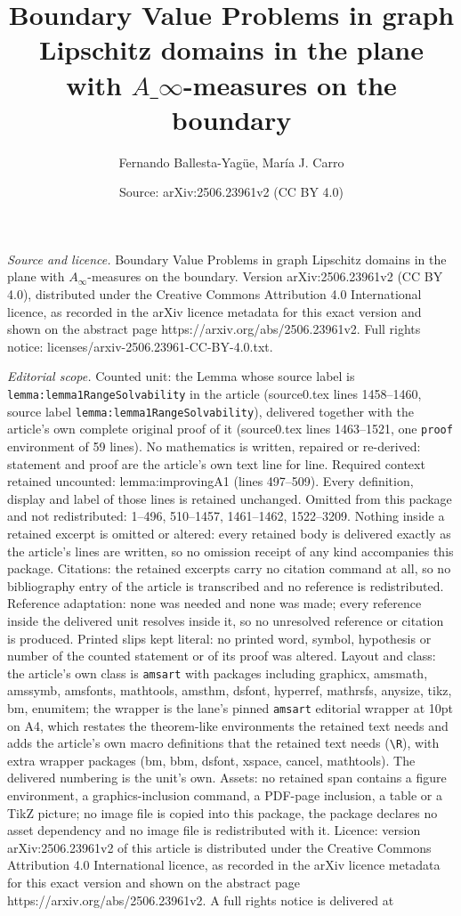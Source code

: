 \documentclass[10pt,a4paper]{amsart}
\title[Boundary Value Problems in graph Lipschitz domains in the pl]{Boundary Value Problems in graph Lipschitz domains in the plane with $A\_{\infty}$-measures on the boundary}
\author{Fernando Ballesta-Yag\"ue, Mar\'ia J. Carro}
\date{Source: arXiv:2506.23961v2 (CC BY 4.0)}
\begin{document}
\maketitle

\noindent\emph{Source and licence.} Boundary Value Problems in graph Lipschitz domains in the plane with $A_{\infty}$-measures on the boundary. Version arXiv:2506.23961v2 (CC BY 4.0), distributed under the Creative Commons Attribution 4.0 International licence, as recorded in the arXiv licence metadata for this exact version and shown on the abstract page https://arxiv.org/abs/2506.23961v2. Full rights notice: licenses/arxiv-2506.23961-CC-BY-4.0.txt.\par\smallskip

\noindent\textit{Editorial scope.} Counted unit: the Lemma whose source label is \texttt{lemma:lemma1RangeSolvability} in the article (source0.tex lines 1458--1460, source label \texttt{lemma:lemma1RangeSolvability}), delivered together with the article's own complete original proof of it (source0.tex lines 1463--1521, one \texttt{proof} environment of 59 lines). No mathematics is written, repaired or re-derived: statement and proof are the article's own text line for line. Required context retained uncounted: lemma:improvingA1 (lines 497--509). Every definition, display and label of those lines is retained unchanged. Omitted from this package and not redistributed: 1--496, 510--1457, 1461--1462, 1522--3209. Nothing inside a retained excerpt is omitted or altered: every retained body is delivered exactly as the article's lines are written, so no omission receipt of any kind accompanies this package. Citations: the retained excerpts carry no citation command at all, so no bibliography entry of the article is transcribed and no reference is redistributed. Reference adaptation: none was needed and none was made; every reference inside the delivered unit resolves inside it, so no unresolved reference or citation is produced. Printed slips kept literal: no printed word, symbol, hypothesis or number of the counted statement or of its proof was altered. Layout and class: the article's own class is \texttt{amsart} with packages including graphicx, amsmath, amssymb, amsfonts, mathtools, amsthm, dsfont, hyperref, mathrsfs, anysize, tikz, bm, enumitem; the wrapper is the lane's pinned \texttt{amsart} editorial wrapper at 10pt on A4, which restates the theorem-like environments the retained text needs and adds the article's own macro definitions that the retained text needs (\texttt{\textbackslash R}), with extra wrapper packages (bm, bbm, dsfont, xspace, cancel, mathtools). The delivered numbering is the unit's own. Assets: no retained span contains a figure environment, a graphics-inclusion command, a PDF-page inclusion, a table or a TikZ picture; no image file is copied into this package, the package declares no asset dependency and no image file is redistributed with it. Licence: version arXiv:2506.23961v2 of this article is distributed under the Creative Commons Attribution 4.0 International licence, as recorded in the arXiv licence metadata for this exact version and shown on the abstract page https://arxiv.org/abs/2506.23961v2. A full rights notice is delivered at 
\end{document}
